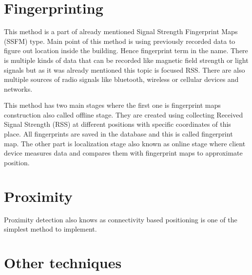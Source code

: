 \section{Fingerprinting}\label{sec:Fingerprinting}
This method is a part of already mentioned Signal Strength Fingerprint Maps (SSFM) type. Main point of this method is using previously recorded data to figure out location inside the building. Hence fingerprint term in the name. There is multiple kinds of data that can be recorded like magnetic field strength or light signals but as it was already mentioned this topic is focused RSS. There are also multiple sources of radio signals like bluetooth, wireless or cellular devices and networks.

This method has two main stages where the first one is fingerprint maps construction also called offline stage. They are created using collecting Received Signal Strength (RSS) at different positions with specific coordinates of this place. All fingerprints are saved in the database and this is called fingerprint map. The other part is localization stage also known as online stage where client device measures data and compares them with fingerprint maps to approximate position. \cite{LocalizationApproaches}\cite{IndoorLocalizationWithoutThePain}

\section{Proximity}\label{sec:Proximity}
Proximity detection also knows as connectivity based positioning is one of the simplest method to implement.

\section{Other techniques}


